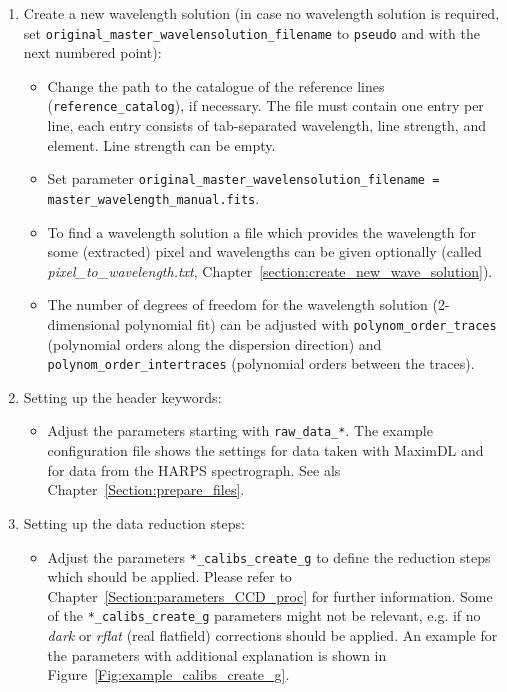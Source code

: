 \documentclass[10pt,a4paper]{article}
\begin{document}
\begin{enumerate}
  \item Create a new wavelength solution (in case no wavelength solution is required, set \verb|original_master_wavelensolution_filename| to \verb|pseudo| and with the next numbered point): \vspace*{-\itemsep}
  \begin{itemize}[leftmargin=*]\setlength\itemsep{0em}
    \item Change the path to the catalogue of the reference lines (\verb|reference_catalog|), if necessary. The file must contain one entry per line, each entry consists of tab-separated wavelength, line strength, and element. Line strength can be empty.
    \item Set parameter \verb|original_master_wavelensolution_filename =| \\
          \verb|master_wavelength_manual.fits|.
    \item To find a wavelength solution a file which provides the wavelength for some (extracted) pixel and wavelengths can be given optionally (called \textit{pixel\_to\_wavelength.txt}, Chapter~\ref{section:create_new_wave_solution}).
    \item The number of degrees of freedom for the wavelength solution (2-dimensional polynomial fit) can be adjusted with \verb|polynom_order_traces| (polynomial orders along the dispersion direction) and \verb|polynom_order_intertraces| (polynomial orders between the traces).
  \end{itemize}
  
  \item Setting up the header keywords: \vspace*{-\itemsep}
  \begin{itemize}[leftmargin=*]\setlength\itemsep{0em}
    \item Adjust the parameters starting with \verb|raw_data_*|. The example configuration file shows the settings for data taken with MaximDL and for data from the HARPS spectrograph. See als Chapter~\ref{Section:prepare_files}.
  \end{itemize}
     
  \item Setting up the data reduction steps: \vspace*{-\itemsep}
  \begin{itemize}[leftmargin=*]\setlength\itemsep{0em}
    \item Adjust the parameters \verb|*_calibs_create_g| to define the reduction steps which should be applied. Please refer to Chapter~\ref{Section:parameters_CCD_proc} for further information. Some of the \verb|*_calibs_create_g| parameters might not be relevant, e.g. if no \textit{dark} or \textit{rflat} (real flatfield) corrections should be applied. An example for the parameters with additional explanation is shown in Figure~\ref{Fig:example_calibs_create_g}.
  \end{itemize}


\end{enumerate}
\end{document}
